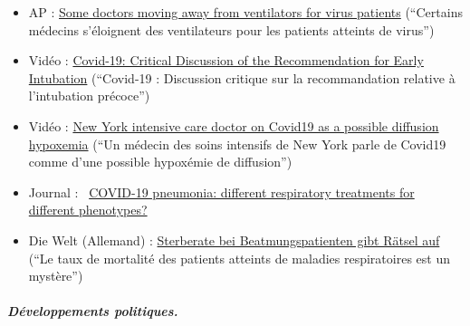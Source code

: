 \begin{itemize}
\tightlist
\item
  AP : \href{https://apnews.com/8ccd325c2be9bf454c2128dcb7bd616d}{Some
  doctors moving away from ventilators for virus patients} (``Certains
  médecins s'éloignent des ventilateurs pour les patients atteints de
  virus'')
\item
  Vidéo : \href{https://www.youtube.com/watch?v=QPlEUAVjxV8}{Covid-19:
  Critical Discussion of the Recommendation for Early Intubation}
  (``Covid-19 : Discussion critique sur la recommandation relative à
  l'intubation précoce'')
\item
  Vidéo : \href{https://www.youtube.com/watch?v=NmRlvX3VrAQ}{New York
  intensive care doctor on Covid19 as a possible diffusion hypoxemia}
  (``Un médecin des soins intensifs de New York parle de Covid19 comme
  d'une possible hypoxémie de diffusion'')
\item
  Journal :~
  \href{https://link.springer.com/article/10.1007/s00134-020-06033-2}{COVID-19
  pneumonia: different respiratory treatments for different phenotypes?}
\item
  Die Welt (Allemand) :
  \href{https://www.welt.de/vermischtes/article207221877/Corona-Pandemie-Sterberate-bei-Beatmungspatienten-gibt-Raetsel-auf.html}{Sterberate
  bei Beatmungspatienten gibt Rätsel auf} (``Le taux de mortalité des
  patients atteints de maladies respiratoires est un mystère'')
\end{itemize}

\hypertarget{duxe9veloppements-politiques}{%
\subparagraph{\texorpdfstring{\textbf{Développements
politiques.}}{Développements politiques.}}\label{duxe9veloppements-politiques}}

